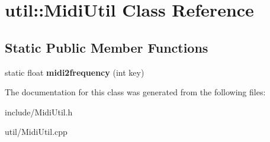 \hypertarget{classutil_1_1MidiUtil}{\section{util\-:\-:Midi\-Util Class Reference}
\label{classutil_1_1MidiUtil}
}
\subsection*{Static Public Member Functions}
\begin{DoxyCompactItemize}
\item 
\hypertarget{classutil_1_1MidiUtil_a04b46794718bd5d4eeaa58b110bea689}{static float {\bfseries midi2frequency} (int key)}\label{classutil_1_1MidiUtil_a04b46794718bd5d4eeaa58b110bea689}

\end{DoxyCompactItemize}


The documentation for this class was generated from the following files\-:\begin{DoxyCompactItemize}
\item 
include/Midi\-Util.\-h\item 
util/Midi\-Util.\-cpp\end{DoxyCompactItemize}
